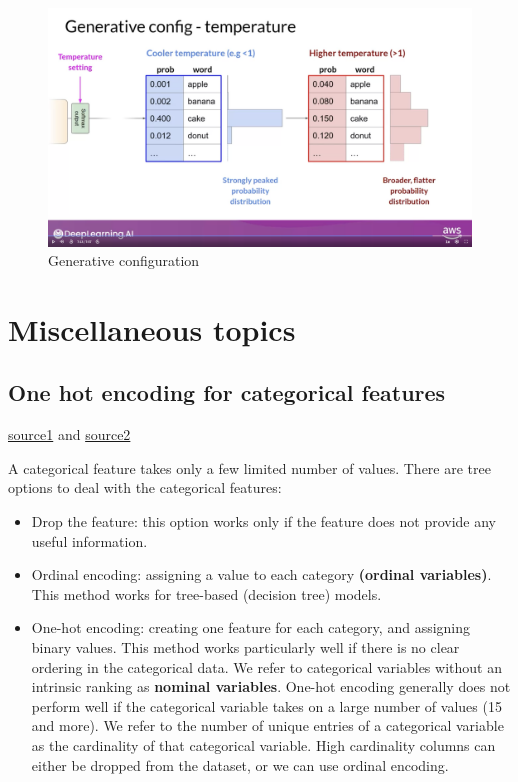 \documentclass[12pt]{report}
\begin{document}
\begin{enumerate}
  \begin{figure}[H]
    \centering
    \caption{Generative configuration}
    \includegraphics[trim=3cm 6cm 5cm 0cm,clip,scale=0.15]{pics/temperature.png}
  \end{figure}



\end{enumerate}




\chapter[Miscellaneous topics]{Miscellaneous topics}

\section{One hot encoding for categorical features}
\label{sec:one-hot}

\href{https://www.youtube.com/watch?v=v_4KWmkwmsU&ab_channel=deeplizard}{source1} and \href{https://machinelearningmastery.com/how-to-one-hot-encode-sequence-data-in-python/}{source2}

A categorical feature takes only a few limited number of values. There are tree options to deal with the categorical features:
\begin{itemize}
  \item Drop the feature: this option works only if the feature does not provide any useful information.
  \item Ordinal encoding: assigning a value to each category \textbf{(ordinal variables)}. This method works for tree-based (decision tree) models.
  \item One-hot encoding: creating one feature for each category, and assigning binary values. This method works particularly well if there is no clear ordering in the categorical data. We refer to categorical variables without an intrinsic ranking as \textbf{nominal variables}. One-hot encoding generally does not perform well if the categorical variable takes on a large number of values (15 and more). We refer to the number of unique entries of a categorical variable as the cardinality of that categorical variable. High cardinality columns can either be dropped from the dataset, or we can use ordinal encoding.
\end{itemize}
\end{document}
